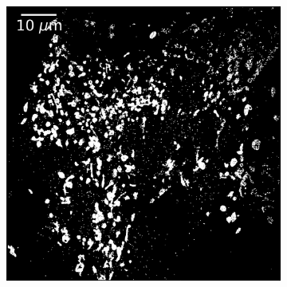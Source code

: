 \begin{figure}
\begin{subfigure}{0.49\textwidth}
        \includegraphics[width=\textwidth]{figures/mitochondria_image6.png}
        \caption{}
    \end{subfigure}
    

\end{figure}
